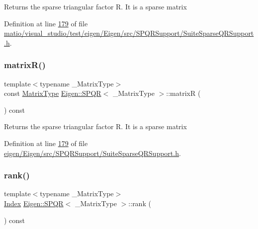 \begin{DoxyReturn}{Returns}
the sparse triangular factor R. It is a sparse matrix 
\end{DoxyReturn}


Definition at line \hyperlink{matio_2visual__studio_2test_2eigen_2_eigen_2src_2_s_p_q_r_support_2_suite_sparse_q_r_support_8h_source_l00179}{179} of file \hyperlink{matio_2visual__studio_2test_2eigen_2_eigen_2src_2_s_p_q_r_support_2_suite_sparse_q_r_support_8h_source}{matio/visual\+\_\+studio/test/eigen/\+Eigen/src/\+S\+P\+Q\+R\+Support/\+Suite\+Sparse\+Q\+R\+Support.\+h}.

\mbox{\label{class_eigen_1_1_s_p_q_r_ad51661be35674dd6a65e27699dbb3fb9}} 
\subsubsection{\texorpdfstring{matrix\+R()}{matrixR()}\hspace{0.1cm}{\footnotesize\ttfamily [2/2]}}
{\footnotesize\ttfamily template$<$typename \+\_\+\+Matrix\+Type$>$ \\
const \hyperlink{group___sparse_core___module}{Matrix\+Type} \hyperlink{class_eigen_1_1_s_p_q_r}{Eigen\+::\+S\+P\+QR}$<$ \+\_\+\+Matrix\+Type $>$\+::matrixR (\begin{DoxyParamCaption}{ }\end{DoxyParamCaption}) const\hspace{0.3cm}{\ttfamily [inline]}}

\begin{DoxyReturn}{Returns}
the sparse triangular factor R. It is a sparse matrix 
\end{DoxyReturn}


Definition at line \hyperlink{eigen_2_eigen_2src_2_s_p_q_r_support_2_suite_sparse_q_r_support_8h_source_l00179}{179} of file \hyperlink{eigen_2_eigen_2src_2_s_p_q_r_support_2_suite_sparse_q_r_support_8h_source}{eigen/\+Eigen/src/\+S\+P\+Q\+R\+Support/\+Suite\+Sparse\+Q\+R\+Support.\+h}.

\mbox{\label{class_eigen_1_1_s_p_q_r_a539b394ddb4894089e6634c744ea2ddc}} 
\subsubsection{\texorpdfstring{rank()}{rank()}\hspace{0.1cm}{\footnotesize\ttfamily [1/2]}}
{\footnotesize\ttfamily template$<$typename \+\_\+\+Matrix\+Type$>$ \\
\hyperlink{namespace_eigen_a62e77e0933482dafde8fe197d9a2cfde}{Index} \hyperlink{class_eigen_1_1_s_p_q_r}{Eigen\+::\+S\+P\+QR}$<$ \+\_\+\+Matrix\+Type $>$\+::rank (\begin{DoxyParamCaption}{ }\end{DoxyParamCaption}) const\hspace{0.3cm}{\ttfamily [inline]}}

